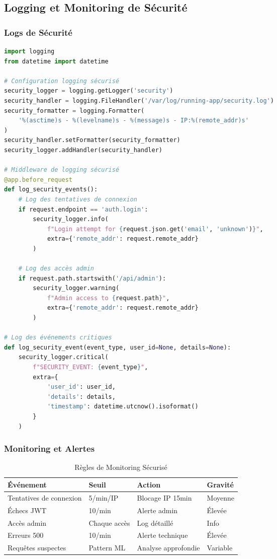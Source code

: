 \subsection{Logging et Monitoring de Sécurité}

\subsubsection{Logs de Sécurité}

\begin{lstlisting}[language=python]
import logging
from datetime import datetime

# Configuration logging sécurisé
security_logger = logging.getLogger('security')
security_handler = logging.FileHandler('/var/log/running-app/security.log')
security_formatter = logging.Formatter(
    '%(asctime)s - %(levelname)s - %(message)s - IP:%(remote_addr)s'
)
security_handler.setFormatter(security_formatter)
security_logger.addHandler(security_handler)

# Middleware de logging sécurisé
@app.before_request
def log_security_events():
    # Log des tentatives de connexion
    if request.endpoint == 'auth.login':
        security_logger.info(
            f"Login attempt for {request.json.get('email', 'unknown')}",
            extra={'remote_addr': request.remote_addr}
        )
    
    # Log des accès admin
    if request.path.startswith('/api/admin'):
        security_logger.warning(
            f"Admin access to {request.path}",
            extra={'remote_addr': request.remote_addr}
        )

# Log des événements critiques
def log_security_event(event_type, user_id=None, details=None):
    security_logger.critical(
        f"SECURITY_EVENT: {event_type}",
        extra={
            'user_id': user_id,
            'details': details,
            'timestamp': datetime.utcnow().isoformat()
        }
    )
\end{lstlisting}

\subsubsection{Monitoring et Alertes}

\begin{table}[H]
\centering
\begin{tabular}{|l|l|l|l|}
\hline
\textbf{Événement} & \textbf{Seuil} & \textbf{Action} & \textbf{Gravité} \\
\hline
Tentatives de connexion & 5/min/IP & Blocage IP 15min & Moyenne \\
Échecs JWT & 10/min & Alerte admin & Élevée \\
Accès admin & Chaque accès & Log détaillé & Info \\
Erreurs 500 & 10/min & Alerte technique & Élevée \\
Requêtes suspectes & Pattern ML & Analyse approfondie & Variable \\
\hline
\end{tabular}
\caption{Règles de Monitoring Sécurisé}
\end{table}

